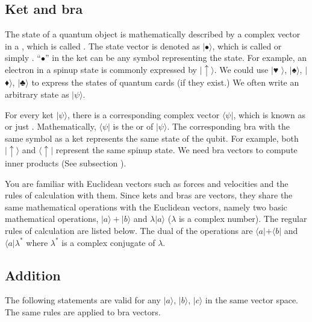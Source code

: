 \documentclass[letterpaper,10pt,english]{jupyterBook}
\begin{document}
\subsection{Ket and bra}
\label{\detokenize{qmsummary/vectors:ket-and-bra}}
\sphinxAtStartPar
The state of a quantum object is mathematically described by a complex vector in a , which is called . The state vector is denoted as \(|\bullet\rangle\), which is called  or simply .  “\(\bullet\)” in the ket can be any symbol representing the state.  For example, an electron in a spin\sphinxhyphen{}up state is commonly expressed by \(|\uparrow\rangle\). We could use \(|\)♥ \(\rangle\), \(|\)♠\(\rangle\), \(|\)♦\(\rangle\), \(|\)♣\(\rangle\) to express the states of quantum cards (if they exist.)  We often write an arbitrary state as \(| \psi\rangle\).

\sphinxAtStartPar
For every ket \(|\psi\rangle\), there is a corresponding complex vector \(\langle\psi|\), which is known as  or just . Mathematically, \(\langle\psi|\) is the  or  of \(|\psi\rangle\).
The corresponding bra with the same symbol as a ket represents the same state of the qubit.  For example, both \(|\uparrow\rangle\) and \(\langle\uparrow|\) represent the same spin\sphinxhyphen{}up state.
We need bra vectors to compute inner products (See subsection {\hyperref[\detokenize{qmsummary/vectors:subsec-innerproduct}]{}}).

\sphinxAtStartPar
You are familiar with Euclidean vectors such as forces and velocities and the rules of calculation with them.
Since kets and bras are vectors, they share the same mathematical operations with the Euclidean vectors, namely two basic mathematical operations,  \(|a\rangle+|b\rangle\) and  \(\lambda |a\rangle\) (\(\lambda\) is a complex number).  The regular rules of calculation are listed below.  The dual of the operations are \(\langle a| + \langle b|\) and \(\langle a | \lambda^*\) where \(\lambda^*\) is a complex conjugate of \(\lambda\).


\subsection{Addition}
\label{\detokenize{qmsummary/vectors:addition}}
\sphinxAtStartPar
The following statements are valid for any \(|a\rangle\), \(|b\rangle\), \(|c\rangle\) in the same vector space.
The same rules are applied to bra vectors.
\end{document}
